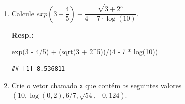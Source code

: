 \documentclass[
]{article}
\newenvironment{Shaded}{\begin{snugshade}}{\end{snugshade}}
\newcommand{\DecValTok}[1]{\textcolor[rgb]{0.00,0.00,0.81}{#1}}
\newcommand{\FunctionTok}[1]{\textcolor[rgb]{0.00,0.00,0.00}{#1}}
\newcommand{\NormalTok}[1]{#1}
\newcommand{\SpecialCharTok}[1]{\textcolor[rgb]{0.00,0.00,0.00}{#1}}
\begin{document}
\begin{enumerate}
\def\labelenumi{\arabic{enumi}.}
\item
  Calcule \(exp\left(3 - \dfrac{4}{5}\right) + \dfrac{\sqrt{3 + 2^5}}{4 - 7 \cdot \log{(10)}}\).

  \textbf{Resp.:}

\begin{Shaded}
\begin{Highlighting}[]
\FunctionTok{exp}\NormalTok{(}\DecValTok{3} \SpecialCharTok{{-}} \DecValTok{4}\SpecialCharTok{/}\DecValTok{5}\NormalTok{) }\SpecialCharTok{+}\NormalTok{ (}\FunctionTok{sqrt}\NormalTok{(}\DecValTok{3} \SpecialCharTok{+} \DecValTok{2}\SpecialCharTok{\^{}}\DecValTok{5}\NormalTok{))}\SpecialCharTok{/}\NormalTok{(}\DecValTok{4} \SpecialCharTok{{-}} \DecValTok{7} \SpecialCharTok{*} \FunctionTok{log}\NormalTok{(}\DecValTok{10}\NormalTok{))}
\end{Highlighting}
\end{Shaded}

\begin{verbatim}
## [1] 8.536811
\end{verbatim}
\item
  Crie o vetor chamado \texttt{x} que contém os seguintes valores \(\left(10, \log{(0,2)}, 6/7, \sqrt{54}, -0,124\right)\).
\end{enumerate}
\end{document}
